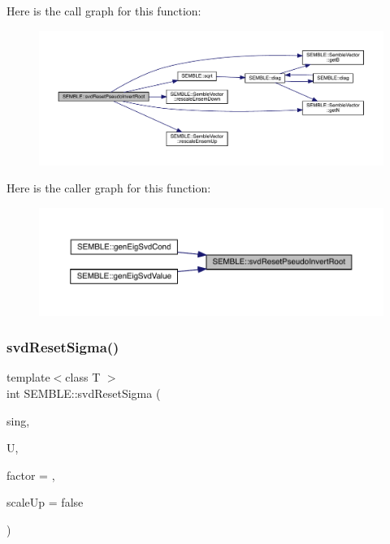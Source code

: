 Here is the call graph for this function\+:
\nopagebreak
\begin{figure}[H]
\begin{center}
\leavevmode
\includegraphics[width=350pt]{d7/dfd/namespaceSEMBLE_a609d3c49c36408c280b11e2b5a8a5395_cgraph}
\end{center}
\end{figure}
Here is the caller graph for this function\+:
\nopagebreak
\begin{figure}[H]
\begin{center}
\leavevmode
\includegraphics[width=350pt]{d7/dfd/namespaceSEMBLE_a609d3c49c36408c280b11e2b5a8a5395_icgraph}
\end{center}
\end{figure}
\mbox{\label{namespaceSEMBLE_a716943d11bf0bdc659ad5ca5834ecf43}} 
\subsubsection{\texorpdfstring{svdResetSigma()}{svdResetSigma()}}
{\footnotesize\ttfamily template$<$class T $>$ \\
int S\+E\+M\+B\+L\+E\+::svd\+Reset\+Sigma (\begin{DoxyParamCaption}\item[{\mbox{\hyperlink{structSEMBLE_1_1SembleVector}{Semble\+Vector}}$<$ double $>$ \&}]{sing,  }\item[{\mbox{\hyperlink{structSEMBLE_1_1SembleMatrix}{Semble\+Matrix}}$<$ T $>$ \&}]{U,  }\item[{const double}]{factor = {},  }\item[{const bool}]{scale\+Up = {\ttfamily false} }\end{DoxyParamCaption})}

